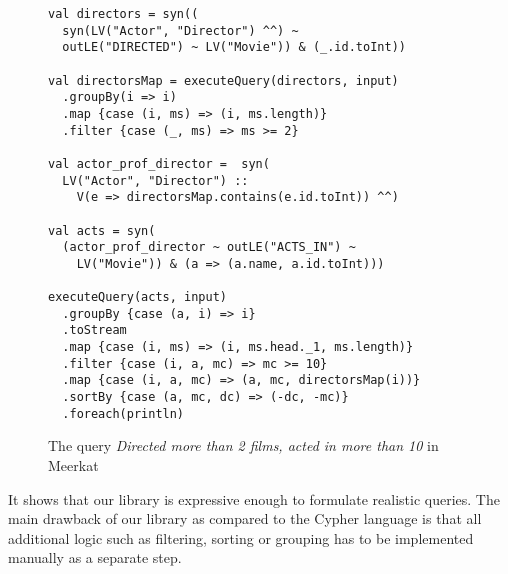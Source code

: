\begin{figure}[h]
\begin{lstlisting}
val directors = syn((
  syn(LV("Actor", "Director") ^^) ~
  outLE("DIRECTED") ~ LV("Movie")) & (_.id.toInt))

val directorsMap = executeQuery(directors, input)
  .groupBy(i => i)
  .map {case (i, ms) => (i, ms.length)}
  .filter {case (_, ms) => ms >= 2}

val actor_prof_director =  syn(
  LV("Actor", "Director") ::
    V(e => directorsMap.contains(e.id.toInt)) ^^)

val acts = syn(
  (actor_prof_director ~ outLE("ACTS_IN") ~
    LV("Movie")) & (a => (a.name, a.id.toInt)))

executeQuery(acts, input)
  .groupBy {case (a, i) => i}
  .toStream
  .map {case (i, ms) => (i, ms.head._1, ms.length)}
  .filter {case (i, a, mc) => mc >= 10}
  .map {case (i, a, mc) => (a, mc, directorsMap(i))}
  .sortBy {case (a, mc, dc) => (-dc, -mc)}
  .foreach(println)

\end{lstlisting}
\caption{The query \emph{Directed more than 2 films, acted in more than 10} in Meerkat}
\label{fig:directed}
\end{figure}

It shows that our library is expressive enough to formulate realistic queries.
The main drawback of our library as compared to the Cypher language is that all additional logic such as
filtering, sorting or grouping has to be implemented manually as a separate step.